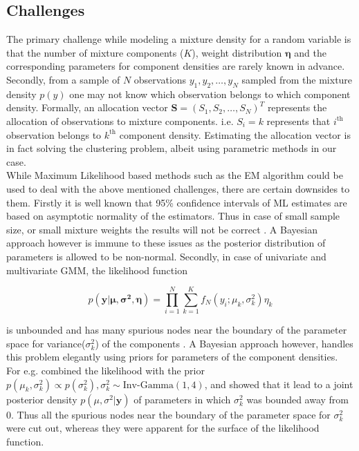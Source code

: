 \subsection{Challenges}
\label{subsec : challenges_mixture_density}
The primary challenge while modeling a mixture density for a random variable is that the number of mixture components ($K$), weight distribution $\boldsymbol{\eta}$ and the corresponding parameters for component densities are rarely known in advance. Secondly, from a sample of $N$ observations $y_1, y_2, \ldots, y_N$ sampled from the mixture density $p(y)$ one may not know which observation belongs to which component density. Formally, an allocation vector $\boldsymbol{S} = (S_1, S_2, \ldots, S_N)^T$ represents the allocation of observations to mixture components. i.e. $S_i = k$ represents that $i^\text{th}$ observation belongs to $k^\text{th}$ component density. Estimating the allocation vector is in fact solving the clustering problem, albeit using parametric methods in our case.\\

While Maximum Likelihood based methods such as the EM algorithm could be used to deal with the above mentioned challenges, there are certain downsides to them. Firstly it is well known that 95\% confidence intervals of ML estimates are based on asymptotic normality of the estimators. Thus in case of small sample size, or small mixture weights the results will not be correct \citep[pg. 35]{fruhwirth-schnatter_finite_2013}. A Bayesian approach however is immune to these issues as the posterior distribution of parameters is allowed to be non-normal. Secondly, in case of univariate and multivariate GMM, the likelihood function

$$ p(\boldsymbol{y}|\boldsymbol{\mu}, \boldsymbol{\sigma^2}, \boldsymbol{\eta}) = \prod_{i=1}^{N} \sum_{k=1}^{K} f_N(y_i; \mu_k, \sigma^2_k) \eta_k$$

is unbounded and has many spurious nodes near the boundary of the parameter space for variance($\sigma^2_k$) of the components \citep{kiefer_consistency_1956,day_estimating_1969}. A Bayesian approach however, handles this problem elegantly using priors for parameters of the component densities. For e.g. \citet[pg. 176]{fruhwirth-schnatter_finite_2013} combined the likelihood with the prior $p(\mu_k, \sigma^2_k) \propto p(\sigma^2_k), \sigma^2_k\sim \text{Inv-Gamma}(1,4)$, and showed that it lead to a joint posterior density $p(\mu, \sigma^2 | \boldsymbol{y})$ of parameters in which $\sigma^2_k$ was bounded away from 0. Thus all the spurious nodes near the boundary of the parameter space for $\sigma^2_k$ were cut out, whereas they were apparent for the surface of the likelihood function.

